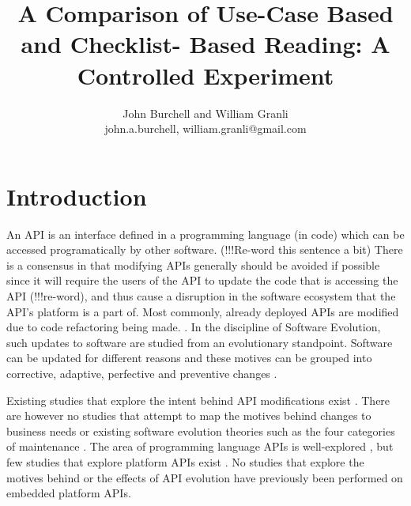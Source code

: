 \documentclass[10pt,twocolumn]{article}
\begin{document}
\title{A Comparison of Use-Case Based and Checklist-
Based Reading: A Controlled Experiment}

\author{John Burchell and William Granli \\
john.a.burchell, william.granli@gmail.com}


\maketitle
\thispagestyle{empty}


\section{Introduction}
An API is an interface defined in a programming language (in code) which can be accessed programatically by other software. (!!!Re-word this sentence a bit) There is a consensus in that modifying APIs generally should be avoided if possible \cite{google_talk} \cite{mcdonnell2013empirical} \cite{robbes2012developers} \cite{henning2007api} \cite{robbes2012developers} since it will require the users of the API to update the code that is accessing the API (!!!re-word), and thus cause a disruption in the software ecosystem \cite{messerschmitt2005software} that the API's platform is a part of. Most commonly, already deployed APIs are modified due to code refactoring being made. \cite{dig2005role} \cite{xing2006refactoring}. 
In the discipline of Software Evolution, such updates to software are studied from an evolutionary standpoint. Software can be updated for different reasons and these motives can be grouped into corrective, adaptive, perfective and preventive changes \cite{lientz1980software} \cite{iso}. 

Existing studies that explore the intent behind API modifications exist \cite{hou2011exploring}. There are however no studies that attempt to map the motives behind changes to business needs or existing software evolution theories such as the four categories of maintenance \cite{lientz1980software}. The area of programming language APIs is well-explored \cite{hou2011exploring} \cite{shi2011empirical}, but few studies that explore platform APIs exist \cite{robbes2012developers}. No studies that explore the motives behind or the effects of API evolution have previously been performed on embedded platform APIs. 
\end{document}
